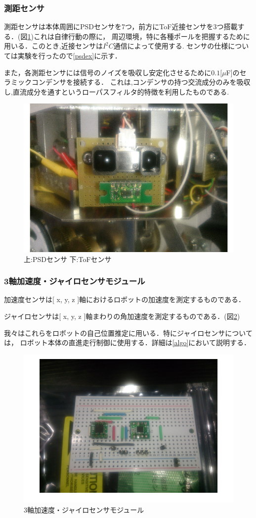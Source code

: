 \documentclass[10pt,a4j]{ujarticle}
\begin{document}
\subsubsection{測距センサ}  
測距センサは本体周囲にPSDセンサを7つ，前方にToF近接センサを3つ搭載する．(図\ref{Distance})これは自律行動の際に，
周辺環境，特に各種ポールを把握するために用いる．このとき,近接センサは$I^2 C$通信によって使用する.
センサの仕様については実験を行ったので\ref{psdex}に示す．

また，各測距センサには信号のノイズを吸収し安定化させるために$0.1[\mu $F]のセラミックコンデンサを接続する．
これは,コンデンサの持つ交流成分のみを吸収し,直流成分を通すというローパスフィルタ的特徴を利用したものである.

\begin{figure}[b]
 \centering
 \includegraphics[width=0.5\hsize]{./picture/Distance.png}
    \caption{上:PSDセンサ 下:ToFセンサ}
    \label{Distance}
\end{figure}
\subsubsection{3軸加速度・ジャイロセンサモジュール}
加速度センサは[ x, y, z ]軸におけるロボットの加速度を測定するものである．

ジャイロセンサは[ x, y, z ]軸まわりの角加速度を測定するものである．(図\ref{jairo})

我々はこれらをロボットの自己位置推定に用いる．特にジャイロセンサについては，
ロボット本体の直進走行制御に使用する．詳細は\ref{algo}において説明する．
\begin{figure}[t]
 \centering
 \includegraphics[width=0.4\hsize]{./picture/jairo.png}
    \caption{3軸加速度・ジャイロセンサモジュール}
    \label{jairo}
\end{figure}
\end{document}
